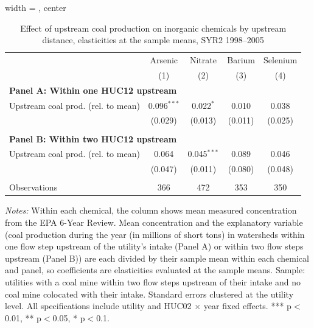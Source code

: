\begin{table}[htbp]
   
   \caption{\label{tab:6yr_huc02fe_inorg_ravalli_2005_k2_elas_prod} Effect of upstream coal production on inorganic chemicals by upstream distance, elasticities at the sample means, SYR2 1998--2005}
   \bigskip
   
   \centering
   
\begin{adjustbox}{width = \textwidth, center}
   \begin{tabular}{lcccc}
      \toprule
       & Arsenic & Nitrate & Barium & Selenium \\
                                         & (1)           & (2)         & (3)     & (4)\\  
      \midrule 
      \multicolumn{5}{l}{\textbf{Panel A: Within one HUC12 upstream}} \\
      Upstream coal prod. (rel. to mean) & 0.096$^{***}$ & 0.022$^{*}$ & 0.010   & 0.038\\   
                                         & (0.029)       & (0.013)     & (0.011) & (0.025)\\   
       \\
      \midrule 
      \multicolumn{5}{l}{\textbf{Panel B: Within two HUC12 upstream}} \\
      Upstream coal prod. (rel. to mean) & 0.064   & 0.045$^{***}$ & 0.089   & 0.046\\   
                                         & (0.047) & (0.011)       & (0.080) & (0.048)\\   
       \\
      Observations                       & 366     & 472           & 353     & 350\\  
      \bottomrule
   \end{tabular}
\end{adjustbox}
   
   {\tiny\linespread{1}\selectfont \par \raggedright 
   \textit{Notes:} Within each chemical, the column shows mean measured concentration from the EPA 6-Year Review. Mean concentration and the explanatory variable (coal production during the year (in millions of short tons) in watersheds within one flow step upstream of the utility's intake (Panel A) or within two flow steps upstream (Panel B)) are each divided by their sample mean within each chemical and panel, so coefficients are elasticities evaluated at the sample means. Sample: utilities with a coal mine within two flow steps upstream of their intake and no coal mine colocated with their intake. Standard errors clustered at the utility level. All specifications include utility and HUC02 $\times$ year fixed effects. *** p$<$0.01, ** p$<$0.05, * p$<$0.1.}
   
\end{table}


